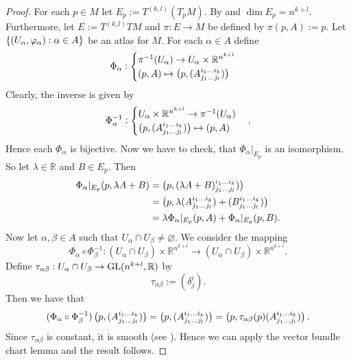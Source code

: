 \begin{appendix}
\begin{proof}
For each $p \in M$ let $E_p := T^{(k,l)}(T_pM)$. By \cite[57]{lee:smooth_manifolds:2013} and \cite[313]{lee:smooth_manifolds:2013} $\dim E_p = n^{k + l}$. Furthermore, let $E := T^{(k,l)}TM$ and $\pi : E \to M$ be defined by $\pi(p,A) := p$. Let $\cbr[0]{(U_\alpha,\varphi_\alpha) : \alpha \in A}$ be an atlas for $M$. For each $\alpha \in A$ define
\begin{equation*}
\Phi_\alpha:\begin{cases}
\pi^{-1}(U_\alpha) \to U_\alpha \times \mathbb{R}^{n^{k + l}}\\
(p,A) \mapsto \del[1]{p,(A^{i_1\dots i_k}_{j_1\dots j_l})}
\end{cases}
\end{equation*}
Clearly, the inverse is given by
\begin{equation*}
\Phi^{-1}_\alpha:\begin{cases}
U_\alpha \times\mathbb{R}^{n^{k + l}} \to \pi^{-1}(U_\alpha)\\
\del[1]{p,(A^{i_1\dots i_k}_{j_1\dots j_l})} \mapsto (p,A)
\end{cases}.
\end{equation*}
Hence each $\Phi_\alpha$ is bijective. Now we have to check, that $\Phi_\alpha\vert_{E_p}$ is an isomorphism. So let $\lambda \in \mathbb{R}$ and $B \in E_p$. Then
\begin{align*}
\Phi_\alpha\vert_{E_p}(p,\lambda A + B) &= \del[1]{p,(\lambda A + B)^{i_1\dots i_k}_{j_1\dots j_l})}\\
&= \del[1]{p,\lambda (A^{i_1\dots i_k}_{j_1\dots j_l}) + (B^{i_1\dots i_k}_{j_1\dots j_l})}\\
&= \lambda\Phi_\alpha\vert_{E_p}(p,A) + \Phi_\alpha\vert_{E_p}(p,B).
\end{align*}
Now let $\alpha, \beta \in A$ such that $U_\alpha \cap U_\beta \neq \varnothing$. We consider the mapping
\begin{equation*}
\Phi_\alpha \circ \Phi_\beta^{-1} : (U_\alpha \cap U_\beta) \times \mathbb{R}^{n^{k + l}} \to (U_\alpha \cap U_\beta) \times \mathbb{R}^{n^{k + l}}.
\end{equation*}
Define $\tau_{\alpha\beta}: U_\alpha \cap U_\beta \to \operatorname{GL}(n^{k + l},\mathbb{R})$ by
\begin{equation*}
\tau_{\alpha\beta} := (\delta^i_j).
\end{equation*}
Then we have that
\begin{equation*}
(\Phi_\alpha \circ \Phi_\beta^{-1})\del[1]{p,(A^{i_1\dots i_k}_{j_1\dots j_l})} = \del[1]{p,(A^{i_1\dots i_k}_{j_1\dots j_l})} = \del[1]{p,\tau_{\alpha\beta}(p)(A^{i_1\dots i_k}_{j_1\dots j_l})}.
\end{equation*}
Since $\tau_{\alpha\beta}$ is constant, it is smooth (see \cite[36]{lee:smooth_manifolds:2013}). Hence we can apply the vector bundle chart lemma \cite[253]{lee:smooth_manifolds:2013} and the result follows.
\end{proof}


\end{appendix}
